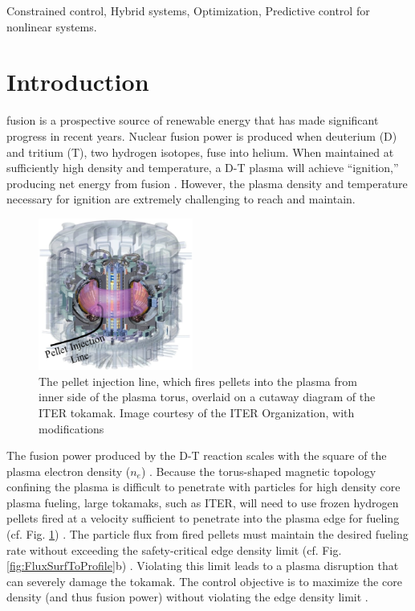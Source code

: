 \documentclass[journal,twoside,web]{ieeecolor}
\begin{document}
\begin{IEEEkeywords}
Constrained control, Hybrid systems, Optimization, Predictive control for nonlinear systems.
\end{IEEEkeywords}

\section{Introduction}
\label{sec:introduction}
 fusion is a prospective source of renewable energy that has made significant progress in recent years. Nuclear fusion power is produced when deuterium (D) and tritium (T), two hydrogen isotopes, fuse into helium. When maintained at sufficiently high density and temperature, a D-T plasma will achieve \enquote{ignition,} producing net energy from fusion \cite{Freidberg2007}. However, the plasma density and temperature necessary for ignition are extremely challenging to reach and maintain. 

\begin{figure}[!b]
\centering
\parbox{2in}{\includegraphics[width=2in]{iter1.eps}}
\caption{The pellet injection line, which fires pellets into the plasma from inner side of the plasma torus, overlaid on a cutaway diagram of the ITER tokamak. Image courtesy of the ITER Organization, with modifications \cite{ITER_CS}}
\label{fig:ITERPIS}
\end{figure}

The fusion power produced by the D-T reaction scales with the square of the plasma electron density ($n_e$) \cite{Freidberg2007}. Because the torus-shaped magnetic topology confining the plasma is difficult to penetrate with particles for high density core plasma fueling, large tokamaks, such as ITER, will need to use frozen hydrogen pellets fired at a velocity sufficient to penetrate into the plasma edge for fueling (cf. Fig. \ref{fig:ITERPIS}) \cite{Baylor2007, Pegourie_2009, Baylor2016}. The particle flux from fired pellets must maintain the desired fueling rate without exceeding the safety-critical edge density limit (cf. Fig. \ref{fig:FluxSurfToProfile}b) \cite{Greenwald1988}. Violating this limit leads to a plasma disruption that can severely damage the tokamak. The control objective is to maximize the core density (and thus fusion power) without violating the edge density limit \cite{Baylor2007}. 
\end{document}
